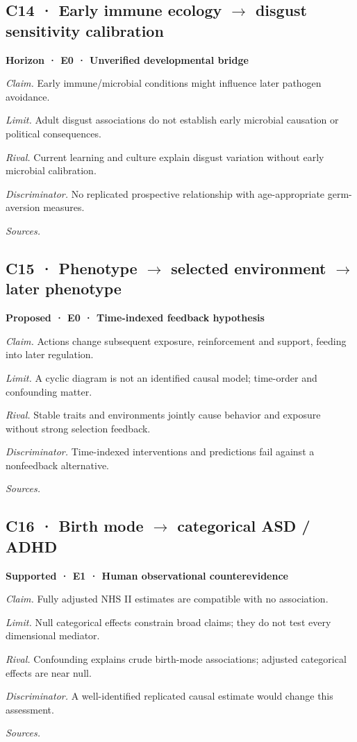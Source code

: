 \subsection*{C14 · Early immune ecology \ensuremath{\rightarrow} disgust sensitivity calibration}
\noindent\textbf{Horizon · E0 · Unverified developmental bridge}\par
\textit{Claim.} Early immune/microbial conditions might influence later pathogen avoidance.\par
\textit{Limit.} Adult disgust associations do not establish early microbial causation or political consequences.\par
\textit{Rival.} Current learning and culture explain disgust variation without early microbial calibration.\par
\textit{Discriminator.} No replicated prospective relationship with age-appropriate germ-aversion measures.\par
\textit{Sources.} \cite{projP3,ref7}\par
\subsection*{C15 · Phenotype \ensuremath{\rightarrow} selected environment \ensuremath{\rightarrow} later phenotype}
\noindent\textbf{Proposed · E0 · Time-indexed feedback hypothesis}\par
\textit{Claim.} Actions change subsequent exposure, reinforcement and support, feeding into later regulation.\par
\textit{Limit.} A cyclic diagram is not an identified causal model; time-order and confounding matter.\par
\textit{Rival.} Stable traits and environments jointly cause behavior and exposure without strong selection feedback.\par
\textit{Discriminator.} Time-indexed interventions and predictions fail against a nonfeedback alternative.\par
\textit{Sources.} \cite{projP1,projP2}\par
\subsection*{C16 · Birth mode \ensuremath{\rightarrow} categorical ASD / ADHD}
\noindent\textbf{Supported · E1 · Human observational counterevidence}\par
\textit{Claim.} Fully adjusted NHS II estimates are compatible with no association.\par
\textit{Limit.} Null categorical effects constrain broad claims; they do not test every dimensional mediator.\par
\textit{Rival.} Confounding explains crude birth-mode associations; adjusted categorical effects are near null.\par
\textit{Discriminator.} A well-identified replicated causal estimate would change this assessment.\par
\textit{Sources.} \cite{ref19}\par
